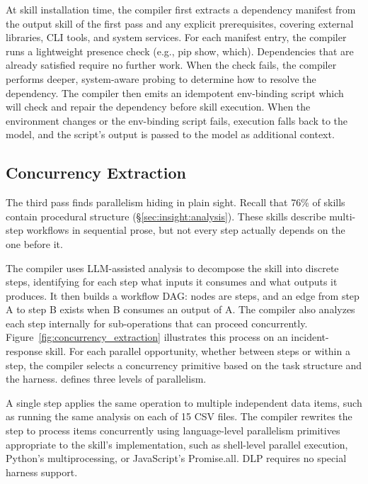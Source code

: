 At skill installation time, the compiler first extracts a dependency manifest from the output
skill of the first pass and any explicit prerequisites, covering external libraries, CLI tools, and system services.
For each manifest entry, the compiler runs a lightweight presence check (e.g., pip show, which).
Dependencies that are already satisfied require no further work.
When the check fails, the compiler performs deeper, system-aware probing to
determine how to resolve the dependency.
The compiler then emits an idempotent env-binding script which will check and repair the dependency before skill execution.
When the environment changes or the env-binding script fails,
execution falls back to the model, and the script's output is passed to the model as additional context.

\subsection{Concurrency Extraction}
\label{sec:compiler:par}

The third pass finds parallelism hiding in plain sight.
Recall that 76\% of skills contain procedural structure
(\S\ref{sec:insight:analysis}). These skills describe
multi-step workflows in sequential prose, but not every step
actually depends on the one before it.

The compiler uses LLM-assisted analysis to decompose the
skill into discrete steps, identifying for each step what
inputs it consumes and what outputs it produces. It then
builds a workflow DAG: nodes are steps, and an edge from
step A to step B exists when B consumes an output of A.
The compiler also analyzes each step internally for
sub-operations that can proceed concurrently.
Figure~\ref{fig:concurrency_extraction} illustrates this
process on an incident-response skill.
For each parallel opportunity, whether between steps or within a
step, the compiler selects a concurrency primitive based
on the task structure and the harness. \sys defines three
levels of parallelism.

A single step applies the same operation to multiple
independent data items, such as running the same analysis
on each of 15 CSV files. The compiler rewrites the step to
process items concurrently using language-level parallelism
primitives appropriate to the skill's implementation, such
as shell-level parallel execution, Python's multiprocessing,
or JavaScript's Promise.all. DLP requires no special
harness support.

